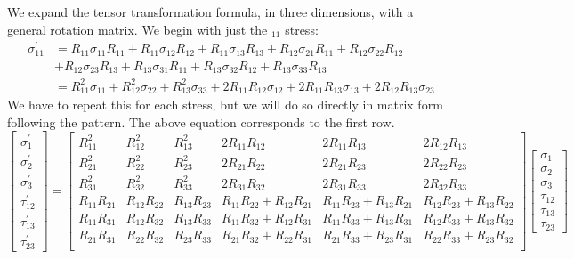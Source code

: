 \documentclass{article}
\begin{document}
We expand the tensor transformation formula, in three dimensions, with a general rotation matrix.  We begin with just the $_{11}$ stress:
\begin{equation}
\begin{aligned}
\sigma_{11}^\prime &= R_{11} \sigma_{11} R_{11} + R_{11} \sigma_{12} R_{12} + R_{11} \sigma_{13} R_{13} + R_{12} \sigma_{21} R_{11} + R_{12} \sigma_{22} R_{12} \\
& + R_{12} \sigma_{23} R_{13} + R_{13} \sigma_{31} R_{11} + R_{13} \sigma_{32} R_{12} + R_{13} \sigma_{33} R_{13}\\
&= R_{11}^2 \sigma_{11} + R_{12}^2 \sigma_{22} + R_{13}^2 \sigma_{33} + 2 R_{11} R_{12} \sigma_{12} + 2 R_{11} R_{13} \sigma_{13} + 2 R_{12} R_{13} \sigma_{23}
\end{aligned}
\end{equation}
We have to repeat this for each stress, but we will do so directly in matrix form following the pattern.  The above equation corresponds to the first row.
\begin{equation}
\begin{bmatrix}
\sigma_1^\prime \\
\sigma_2^\prime \\
\sigma_3^\prime \\
\tau_{12}^\prime \\
\tau_{13}^\prime \\
\tau_{23}^\prime
\end{bmatrix}
=
\begin{bmatrix}
R_{11}^2 & R_{12}^2 & R_{13}^2 & 2 R_{11}R_{12} & 2 R_{11}R_{13} & 2 R_{12}R_{13} \\
R_{21}^2 & R_{22}^2 & R_{23}^2 & 2 R_{21}R_{22} & 2 R_{21}R_{23} & 2 R_{22}R_{23} \\
R_{31}^2 & R_{32}^2 & R_{33}^2 & 2 R_{31}R_{32} & 2 R_{31}R_{33} & 2 R_{32}R_{33} \\
R_{11}R_{21} & R_{12}R_{22} & R_{13}R_{23} & R_{11}R_{22} + R_{12}R_{21} & R_{11}R_{23} + R_{13}R_{21} & R_{12}R_{23} + R_{13}R_{22} \\
R_{11}R_{31} & R_{12}R_{32} & R_{13}R_{33} & R_{11}R_{32} + R_{12}R_{31} & R_{11}R_{33} + R_{13}R_{31} & R_{12}R_{33} + R_{13}R_{32} \\
R_{21}R_{31} & R_{22}R_{32} & R_{23}R_{33} & R_{21}R_{32} + R_{22}R_{31} & R_{21}R_{33} + R_{23}R_{31} & R_{22}R_{33} + R_{23}R_{32} \\
\end{bmatrix}
\begin{bmatrix}
\sigma_1 \\
\sigma_2 \\
\sigma_3 \\
\tau_{12} \\
\tau_{13} \\
\tau_{23}
\end{bmatrix}
\label{eq:Tsigma}
\end{equation}
\end{document}
